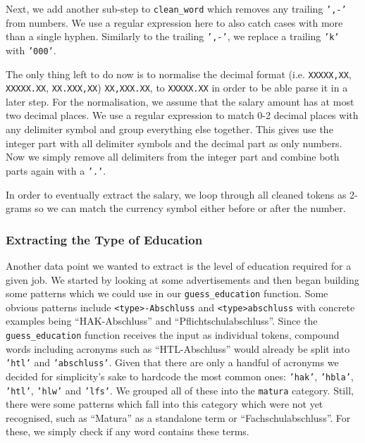 \documentclass[runningheads]{llncs}
\newcommand{\german}[1]{{#1}}
\begin{document}
Next, we add another sub-step to \texttt{clean\_word} which removes any trailing \texttt{',-'} from numbers. We use a regular expression here to also catch cases with more than a single hyphen. Similarly to the trailing \texttt{',-'}, we replace a trailing \texttt{'k'} with \texttt{'000'}.

The only thing left to do now is to normalise the decimal format (i.e. \texttt{XXXXX,XX}, \texttt{XXXXX.XX}, \texttt{XX.XXX,XX}) \texttt{XX,XXX.XX}, to \texttt{XXXXX.XX} in order to be able parse it in a later step. For the normalisation, we assume that the salary amount has at most two decimal places. We use a regular expression to match 0-2 decimal places with any delimiter symbol and group everything else together. This gives use the integer part with all delimiter symbols and the decimal part as only numbers. Now we simply remove all delimiters from the integer part and combine both parts again with a \texttt{'.'}.

In order to eventually extract the salary, we loop through all cleaned tokens as 2-grams so we can match the currency symbol either before or after the number.

\subsubsection{Extracting the Type of Education}
\label{subsub:extracting_the_type_of_education}

Another data point we wanted to extract is the level of education required for a given job. We started by looking at some advertisements and then began building some patterns which we could use in our \texttt{guess\_education} function. Some obvious patterns include \texttt{<type>-Abschluss} and \texttt{<type>abschluss} with concrete examples being “\german{HAK-Abschluss}” and “\german{Pflichtschulabschluss}”. Since the \texttt{guess\_education} function receives the input as individual tokens, compound words including acronyms such as “\german{HTL-Abschluss}” would already be split into \texttt{'htl'} and \texttt{'abschluss'}. Given that there are only a handful of acronyms we decided for simplicity's sake to hardcode the most common ones: \texttt{'hak'}, \texttt{'hbla'}, \texttt{'htl'}, \texttt{'hlw'} and \texttt{'lfs'}. We grouped all of these into the \texttt{matura} category. Still, there were some patterns which fall into this category which were not yet recognised, such as “\german{Matura}” as a standalone term or “\german{Fachschulabschluss}”. For these, we simply check if any word contains these terms.
\end{document}

